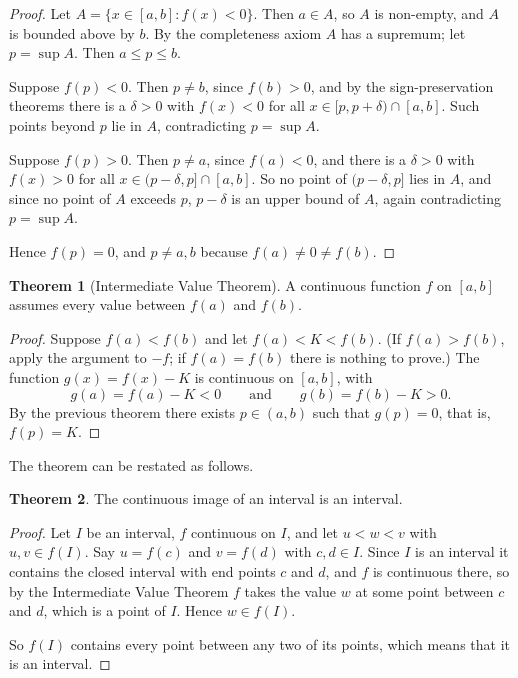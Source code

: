 \documentclass[11pt,a4paper]{article}
\numberwithin{equation}{section}
\theoremstyle{definition}
\newtheorem{thm}{Theorem}[subsection]
\begin{document}
\begin{proof}
Let $A = \{ x\in [a,b]: f(x) < 0\}$. Then $a\in A$, so $A$ is non-empty, and $A$ is bounded above by $b$. By the completeness axiom $A$ has a supremum; let $p = \sup A$. Then $a\leq p\leq b$.

Suppose $f(p) < 0$. Then $p\neq b$, since $f(b)>0$, and by the sign-preservation theorems there is a $\delta>0$ with $f(x)<0$ for all $x\in[p,p+\delta)\cap[a,b]$. Such points beyond $p$ lie in $A$, contradicting $p = \sup A$.

Suppose $f(p) > 0$. Then $p\neq a$, since $f(a)<0$, and there is a $\delta>0$ with $f(x)>0$ for all $x\in(p-\delta,p]\cap[a,b]$. So no point of $(p-\delta, p]$ lies in $A$, and since no point of $A$ exceeds $p$, $p-\delta$ is an upper bound of $A$, again contradicting $p = \sup A$.

Hence $f(p) = 0$, and $p\neq a,b$ because $f(a)\neq0\neq f(b)$.
\end{proof}


\begin{thm}[Intermediate Value Theorem]
A continuous function $f$ on $[a,b]$ assumes every value between $f(a)$ and $f(b)$.
\end{thm}

\begin{proof}
Suppose $f(a) < f(b)$ and let $f(a) < K < f(b)$. (If $f(a)>f(b)$, apply the argument to $-f$; if $f(a)=f(b)$ there is nothing to prove.) The function $g(x) = f(x) - K$ is continuous on $[a,b]$, with
$$g(a) = f(a) - K  < 0 \qquad\text{and}\qquad g(b) = f(b) - K > 0 .$$
By the previous theorem there exists $p\in (a,b)$ such that $g(p) = 0$, that is, $f(p) = K$.
\end{proof}

The theorem can be restated as follows.


\begin{thm}
The continuous image of an interval is an interval.
\end{thm}

\begin{proof}
Let $I$ be an interval, $f$ continuous on $I$, and let $u<w<v$ with $u,v\in f(I)$. Say $u=f(c)$ and $v=f(d)$ with $c,d\in I$. Since $I$ is an interval it contains the closed interval with end points $c$ and $d$, and $f$ is continuous there, so by the Intermediate Value Theorem $f$ takes the value $w$ at some point between $c$ and $d$, which is a point of $I$. Hence $w\in f(I)$.

So $f(I)$ contains every point between any two of its points, which means that it is an interval.
\end{proof}
\end{document}

